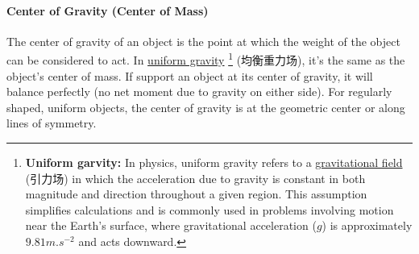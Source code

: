 \paragraph{Center of Gravity (Center of Mass)}
The center of gravity of an object is the point at which the weight of the object can be considered to act. In
\underline{uniform gravity} \footnote{\textbf{Uniform garvity:} In physics, uniform gravity refers to a \underline{gravitational
field} \footnotemark[6] (引力场) in which the acceleration due to gravity is constant in both magnitude and direction throughout a
given region. This assumption simplifies calculations and is commonly used in problems involving motion near the Earth's surface,
where gravitational acceleration ($g$) is approximately $9.81 \unit{m.s^{-2}}$ and acts downward.} (均衡重力场), it's the same as
the object's center of mass. If support an object at its center of gravity, it will balance perfectly (no net moment due to
gravity on either side). For regularly shaped, uniform objects, the center of gravity is at the geometric center or along lines
of symmetry. \par

